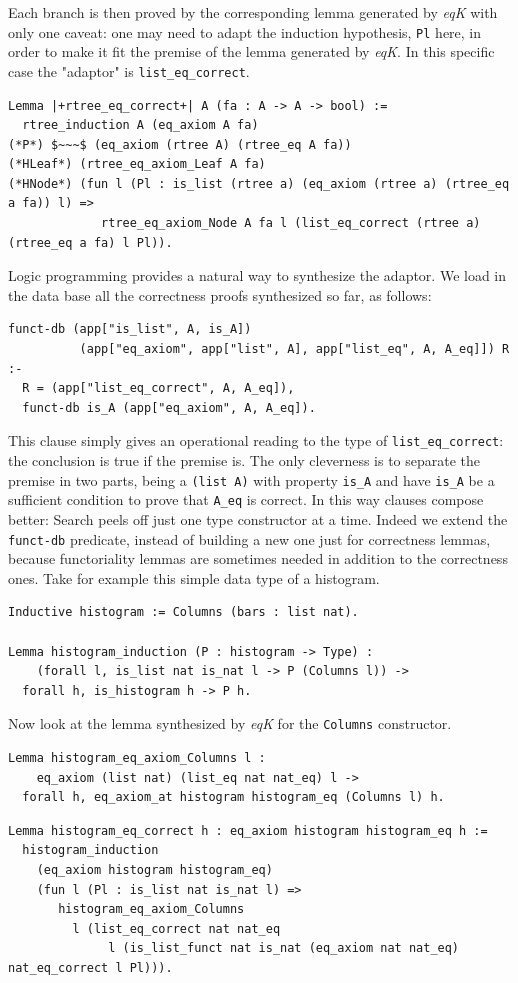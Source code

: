 \documentclass[a4paper,UKenglish,cleveref, autoref]{lipics-v2019}
\newcommand{\derive}[1]{\emph{#1}}
\begin{document}
\noindent
Each branch is then proved by the corresponding
lemma generated by \derive{eqK} with only one caveat:
one may need to adapt the induction hypothesis, 
\lstinline+Pl+ here, in order to make it fit the premise
of the lemma generated by \derive{eqK}. In this specific
case the "adaptor" is \lstinline+list_eq_correct+.
\begin{lstlisting}
Lemma |+rtree_eq_correct+| A (fa : A -> A -> bool) :=
  rtree_induction A (eq_axiom A fa)
(*P*) $~~~$ (eq_axiom (rtree A) (rtree_eq A fa))
(*HLeaf*) (rtree_eq_axiom_Leaf A fa)
(*HNode*) (fun l (Pl : is_list (rtree a) (eq_axiom (rtree a) (rtree_eq a fa)) l) =>
             rtree_eq_axiom_Node A fa l (list_eq_correct (rtree a) (rtree_eq a fa) l Pl)).
\end{lstlisting}

Logic programming provides a natural way to synthesize
the adaptor.  We load in the data base
all the correctness proofs synthesized so far, as follows:
\begin{lstlisting}[]
funct-db (app["is_list", A, is_A])
          (app["eq_axiom", app["list", A], app["list_eq", A, A_eq]]) R :-
  R = (app["list_eq_correct", A, A_eq]),
  funct-db is_A (app["eq_axiom", A, A_eq]).
\end{lstlisting}

\noindent
This clause simply gives an operational reading to the type
of \lstinline+list_eq_correct+: the conclusion is true if the premise
is. The only cleverness is to separate the premise in two parts,
being a \lstinline+(list A)+ with property \lstinline+is_A+ and have
\lstinline+is_A+ be a sufficient condition to prove that \lstinline+A_eq+
is correct. In this way clauses compose better:
Search peels off just one type constructor at a time.
Indeed we extend the \lstinline+funct-db+ predicate, instead of building
a new one just for correctness lemmas, because functoriality lemmas
are sometimes needed in addition to the correctness ones.
Take for example this simple data type of a histogram.
\begin{lstlisting}
Inductive histogram := Columns (bars : list nat).

Lemma histogram_induction (P : histogram -> Type) :
    (forall l, is_list nat is_nat l -> P (Columns l)) ->
  forall h, is_histogram h -> P h.
\end{lstlisting}

Now look at the lemma synthesized by \derive{eqK}
for the \lstinline+Columns+ constructor.
\begin{lstlisting}
Lemma histogram_eq_axiom_Columns l :
    eq_axiom (list nat) (list_eq nat nat_eq) l ->
  forall h, eq_axiom_at histogram histogram_eq (Columns l) h.
\end{lstlisting}
\begin{lstlisting}
Lemma histogram_eq_correct h : eq_axiom histogram histogram_eq h :=
  histogram_induction 
    (eq_axiom histogram histogram_eq)
    (fun l (Pl : is_list nat is_nat l) =>
       histogram_eq_axiom_Columns
         l (list_eq_correct nat nat_eq
              l (is_list_funct nat is_nat (eq_axiom nat nat_eq) nat_eq_correct l Pl))).
\end{lstlisting}
\end{document}
